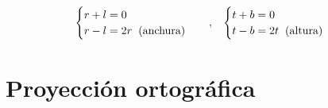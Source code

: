 \begin{equation*}
  \begin{cases}
    r+l = 0\\
    r-l = 2r \hspace*{0.2cm} \text{(anchura)} \\
  \end{cases}
  \hspace*{0.3cm} , \hspace*{0.3cm}
  \begin{cases}
    t+b=0 \\
    t-b=2t \hspace*{0.2cm} \text{(altura)} \\
  \end{cases}
\end{equation*}

\section{Proyección ortográfica}
